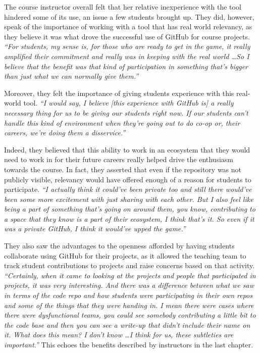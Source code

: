 The course instructor overall felt that her relative inexperience with the tool hindered some of its use, an issue a few students brought up. They did, however, speak of the importance of working with a tool that has real world relevancy, as they believe it was what drove the successful use of GitHub for course projects. \textit{``For students, my sense is, for those who are ready to get in the game, it really amplified their commitment and really was in keeping with the real world \ldots So I believe that the benefit was that kind of participation in something that's bigger than just what we can normally give them.''}

Moreover, they felt the importance of giving students experience with this real-world tool. \textit{``I would say, I believe [this experience with GitHub is] a really necessary thing for us to be giving our students right now. If our students can't handle this kind of environment when they're going out to do co-op or, their careers, we're doing them a disservice.''}

Indeed, they believed that this ability to work in an ecosystem that they would need to work in for their future careers really helped drive the enthusiasm towards the course. In fact, they asserted that even if the repository was not publicly visible, relevancy would have offered enough of a reason for students to participate. \textit{``I actually think it could've been private too and still there would've been some more excitement with just sharing with each other. But I also feel like being a part of something that's going on around them, you know, contributing to a space that they know is a part of their ecosystem, I think that's it. So even if it was a private GitHub, I think it would've upped the game.''}


They also saw the advantages to the openness afforded by having students collaborate using GitHub for their projects, as it allowed the teaching team to track student contributions to projects and raise concerns based on that activity. \textit{``Certainly, when it came to looking at the projects and people that participated in projects, it was very interesting. And there was a difference between what we saw in terms of the code repo and how students were participating in their own repos and some of the things that they were handing in. I mean there were cases where there were dysfunctional teams, you could see somebody contributing a little bit to the code base and then you can see a write-up that didn't include their name on it. What does this mean? I don't know \ldots I think for us, these subtleties are important.''}
This echoes the benefits described by instructors in the last chapter.

